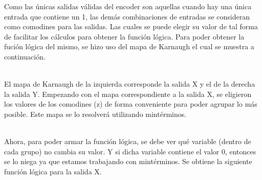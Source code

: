 Como las \'unicas salidas v\'alidas del encoder son aquellas cuando hay una \'unica entrada que contiene un 1, las dem\'as combinaciones de entradas se consideran como comodines para las salidas. Las cuales
se puede elegir su valor de tal forma de facilitar los cálculos para obtener la funci\'on l\'ogica.
Para poder obtener la fuci\'on l\'ogica del mismo, se hizo uso del mapa de Karnaugh el cual se muestra
a continuación.
\\
\begin{Karnaugh}
\end{Karnaugh}
\begin{Karnaugh}
\end{Karnaugh}
\\
El mapa de Karnaugh de la izquierda corresponde la salida X y el de la derecha la salida Y.
Empezando con el mapa correspondiente a la salida X, se eligieron los valores de los comodines (z) de forma conveniente para poder agrupar lo m\'as posible. Este mapa se lo resolver\'a utilizando mint\'erminos.
\\
\begin{Karnaugh}
\end{Karnaugh}
\\
Ahora, para poder armar la funci\'on l\'ogica, se debe ver qu\'e variable (dentro de cada grupo) no cambia su valor. Y si dicha variable contiene el valor 0, entonces se lo niega ya que estamos trabajando con mint\'erminos. Se obtiene la siguiente funci\'on l\'ogica para la salida X.

